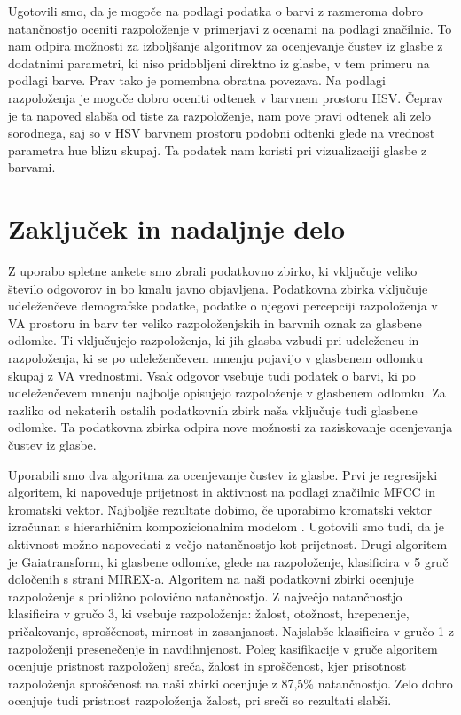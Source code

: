 \documentclass[a4paper, 12pt]{book}
\begin{document}
{Ugotovili smo, da je mogoče na podlagi podatka o barvi z razmeroma dobro natančnostjo oceniti razpoloženje v primerjavi z ocenami na podlagi značilnic. To nam odpira možnosti za izboljšanje algoritmov za ocenjevanje čustev iz glasbe z dodatnimi parametri, ki niso pridobljeni direktno iz glasbe, v tem primeru na podlagi barve. Prav tako je pomembna obratna povezava. Na podlagi razpoloženja je mogoče dobro oceniti odtenek v barvnem prostoru HSV. Čeprav je ta napoved slabša od tiste za razpoloženje, nam pove pravi odtenek ali zelo sorodnega, saj so v HSV barvnem prostoru podobni odtenki glede na vrednost parametra hue blizu skupaj. Ta podatek nam koristi pri vizualizaciji glasbe z barvami.

\chapter{Zaključek in nadaljnje delo}

Z uporabo spletne ankete smo zbrali podatkovno zbirko, ki vključuje veliko število odgovorov in bo kmalu javno objavljena. Podatkovna zbirka vključuje udeleženčeve demografske podatke, podatke o njegovi percepciji razpoloženja v VA prostoru in barv ter veliko razpoloženjskih in barvnih oznak za glasbene odlomke. Ti vključujejo razpoloženja, ki jih glasba vzbudi pri udeležencu in razpoloženja, ki se po udeleženčevem mnenju pojavijo v glasbenem odlomku skupaj z VA vrednostmi. Vsak odgovor vsebuje tudi podatek o barvi, ki po udeleženčevem mnenju najbolje opisujejo razpoloženje v glasbenem odlomku. Za razliko od nekaterih ostalih podatkovnih zbirk naša vključuje tudi glasbene odlomke. Ta podatkovna zbirka odpira nove možnosti za raziskovanje ocenjevanja čustev iz glasbe.  

Uporabili smo dva algoritma za ocenjevanje čustev iz glasbe. Prvi je regresijski algoritem, ki napoveduje prijetnost in aktivnost na podlagi značilnic MFCC in kromatski vektor. Najboljše rezultate dobimo, če uporabimo kromatski vektor izračunan s hierarhičnim kompozicionalnim modelom \cite{Pesek2013}. Ugotovili smo tudi, da je aktivnost možno napovedati z večjo natančnostjo kot prijetnost. Drugi algoritem je Gaiatransform, ki glasbene odlomke, glede na razpoloženje, klasificira v 5 gruč določenih s strani MIREX-a. Algoritem na naši podatkovni zbirki ocenjuje razpoloženje s približno polovično natančnostjo. Z največjo natančnostjo klasificira v gručo 3, ki vsebuje razpoloženja: žalost, otožnost, hrepenenje, pričakovanje, sproščenost, mirnost in zasanjanost. Najslabše klasificira v gručo 1 z razpoloženji presenečenje in navdihnjenost. Poleg kasifikacije v gruče algoritem ocenjuje pristnost razpoloženj sreča, žalost in sproščenost, kjer prisotnost razpoloženja sproščenost na naši zbirki ocenjuje z 87,5\% natančnostjo. Zelo dobro ocenjuje tudi pristnost razpoloženja žalost, pri sreči so rezultati slabši. 

}
\end{document}
